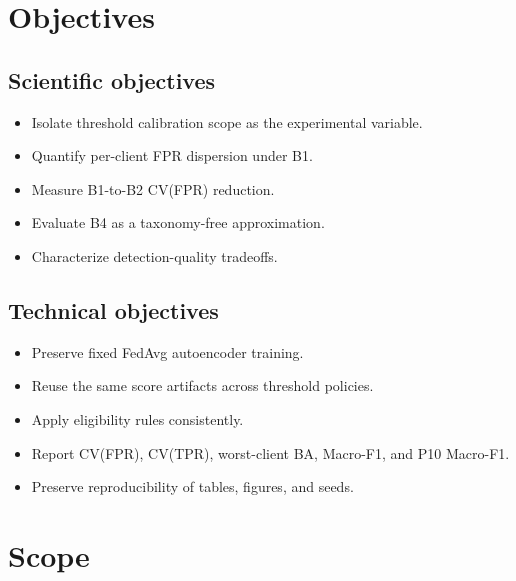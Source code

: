 \section{Objectives}

\begin{minipage}[t]{0.48\linewidth}
\subsection*{Scientific objectives}
\begin{itemize}
  \item Isolate threshold calibration scope as the experimental variable.
  \item Quantify per-client FPR dispersion under B1.
  \item Measure B1-to-B2 CV(FPR) reduction.
  \item Evaluate B4 as a taxonomy-free approximation.
  \item Characterize detection-quality tradeoffs.
\end{itemize}
\end{minipage}%
\hfill
\begin{minipage}[t]{0.48\linewidth}
\subsection*{Technical objectives}
\begin{itemize}
  \item Preserve fixed FedAvg autoencoder training.
  \item Reuse the same score artifacts across threshold policies.
  \item Apply eligibility rules consistently.
  \item Report CV(FPR), CV(TPR), worst-client BA, Macro-F1, and P10 Macro-F1.
  \item Preserve reproducibility of tables, figures, and seeds.
\end{itemize}
\end{minipage}

\vspace{0.5em}

\section{Scope}

